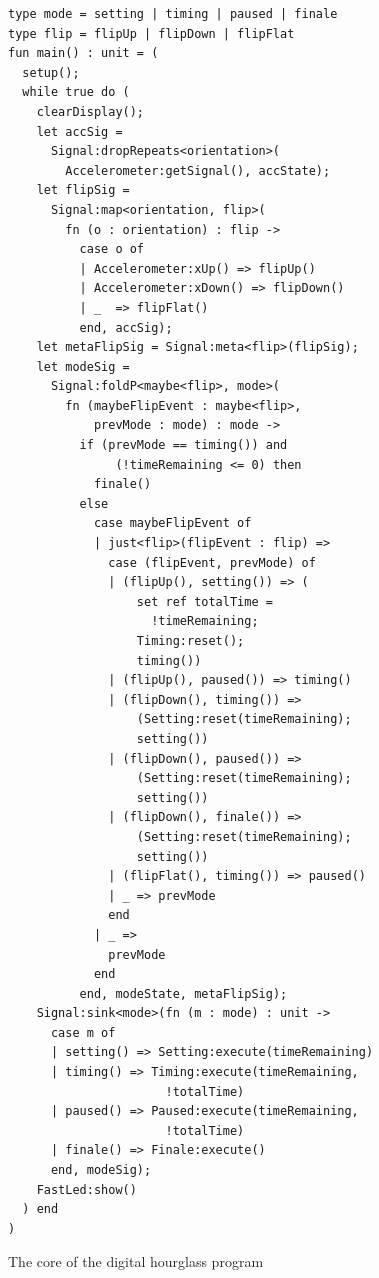 \documentclass{sigplanconf}
\begin{document}
\begin{figure}
\begin{verbatim}
type mode = setting | timing | paused | finale
type flip = flipUp | flipDown | flipFlat
fun main() : unit = (
  setup();
  while true do (
    clearDisplay();
    let accSig =
      Signal:dropRepeats<orientation>(
        Accelerometer:getSignal(), accState);
    let flipSig =
      Signal:map<orientation, flip>(
        fn (o : orientation) : flip ->
          case o of
          | Accelerometer:xUp() => flipUp()
          | Accelerometer:xDown() => flipDown()
          | _  => flipFlat()
          end, accSig);
    let metaFlipSig = Signal:meta<flip>(flipSig);
    let modeSig =
      Signal:foldP<maybe<flip>, mode>(
        fn (maybeFlipEvent : maybe<flip>,
            prevMode : mode) : mode ->
          if (prevMode == timing()) and
               (!timeRemaining <= 0) then
            finale()
          else
            case maybeFlipEvent of
            | just<flip>(flipEvent : flip) =>
              case (flipEvent, prevMode) of
              | (flipUp(), setting()) => (
                  set ref totalTime =
                  	!timeRemaining;
                  Timing:reset();
                  timing())
              | (flipUp(), paused()) => timing()
              | (flipDown(), timing()) =>
                  (Setting:reset(timeRemaining);
                  setting())
              | (flipDown(), paused()) =>
                  (Setting:reset(timeRemaining);
                  setting())
              | (flipDown(), finale()) =>
                  (Setting:reset(timeRemaining);
                  setting())
              | (flipFlat(), timing()) => paused()
              | _ => prevMode
              end
            | _ =>
              prevMode
            end
          end, modeState, metaFlipSig);
    Signal:sink<mode>(fn (m : mode) : unit ->
      case m of
      | setting() => Setting:execute(timeRemaining)
      | timing() => Timing:execute(timeRemaining,
                      !totalTime)
      | paused() => Paused:execute(timeRemaining,
                      !totalTime)
      | finale() => Finale:execute()
      end, modeSig);
    FastLed:show()
  ) end
)
\end{verbatim}
\caption{The core of the digital hourglass program}
\label{fig:digitalhourglasscode}
\end{figure}
\end{document}
